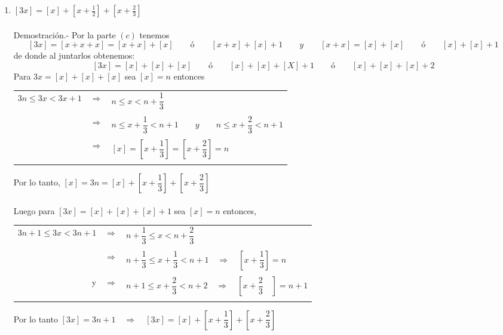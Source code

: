 \begin{enumerate}
\begin{enumerate}[\bfseries (a)]
	    \item $[3x] = [x] + [x + \frac{1}{2}] + [x + \frac{2}{3}]$\\\\
		Demostración.-\; Por la parte $(c)$ tenemos $$[3x]=[x+x+x]=[x+x]+[x] \qquad ó \qquad [x+x] + [x] + 1 \qquad y \qquad [x+x]=[x]+[x] \qquad ó \qquad [x]+[x]+1$$   
		de donde al juntarlos obtenemos:
		$$[3x]=[x]+[x]+[x] \qquad ó \qquad [x]+[x]+[X]+1 \qquad ó \qquad [x]+[x]+[x]+2$$ 
		Para $3x=[x]+[x]+[x]$ sea $[x]=n$ entonces
		\begin{center}
		    \begin{tabular}{rcl}
			$3n\leq 3x<3x+1$&$\Longrightarrow$&$n\leq x<n+\dfrac{1}{3}$\\\\
			&$\Longrightarrow$&$n\leq x+\dfrac{1}{3} < n+1 \qquad y \qquad n \leq x+\dfrac{2}{3} < n+1$\\\\
			&$\Longrightarrow$&$[x]=\left[x+\dfrac{1}{3}\right] = \left[x+\dfrac{2}{3}\right] = n$\\\\
		    \end{tabular}
		\end{center}
		Por lo tanto, $[x]=3n=[x]+\left[x+\dfrac{1}{3}\right] + \left[x +\dfrac{2}{3} \right]$\\\\
		Luego para $[3x]=[x]+[x]+[x] + 1$ sea $[x]=n$ entonces,

		\begin{center}
		    \begin{tabular}{rcl}
			$3n+1 \leq 3x < 3n + 1$&$\Longrightarrow$&$n+\dfrac{1}{3} \leq x < n + \dfrac{2}{3}$\\\\
			&$\Longrightarrow$&$n+\dfrac{1}{3} \leq x+\dfrac{1}{3} < n+1 \quad \Rightarrow \quad \left[x + \dfrac{1}{3} \right] = n$\\\\
			y&$\Longrightarrow$&$n+1\leq x + \dfrac{2}{3} < n+2 \quad \Rightarrow \quad \left[x+\dfrac{2}{3}\quad \right]= n+1$\\\\
		    \end{tabular}
		\end{center}
		Por lo tanto $[3x]=3n+1 \quad \Longrightarrow \quad [3x]=[x] + \left[x+\dfrac{1}{3}\right] + \left[x+\dfrac{2}{3}\right]$\\\\


\end{enumerate}
\end{enumerate}

